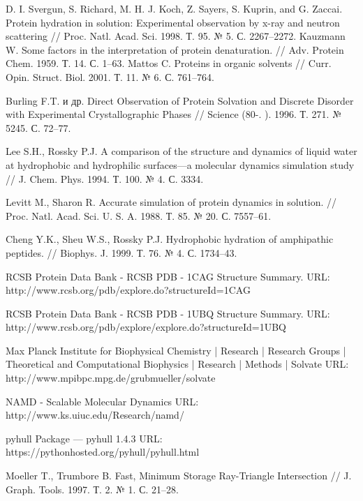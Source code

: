 \documentclass[a4paper]{article}
\begin{document}
\begin{thebibliography}{99}
 D. I. Svergun, S. Richard, M. H. J. Koch, Z. Sayers, S. Kuprin, and G. Zaccai. Protein hydration in solution: Experimental observation by x-ray and neutron scattering // Proc. Natl. Acad. Sci. 1998. Т. 95. № 5. С. 2267–2272.
 Kauzmann W. Some factors in the interpretation of protein denaturation. // Adv. Protein Chem. 1959. Т. 14. С. 1–63.
 Mattos C. Proteins in organic solvents // Curr. Opin. Struct. Biol. 2001. Т. 11. № 6. С. 761–764.


 Burling F.T. и др. Direct Observation of Protein Solvation and Discrete Disorder with Experimental Crystallographic Phases // Science (80-. ). 1996. Т. 271. № 5245. С. 72–77.

  Lee S.H., Rossky P.J. A comparison of the structure and dynamics of liquid water at hydrophobic and hydrophilic surfaces—a molecular dynamics simulation study // J. Chem. Phys. 1994. Т. 100. № 4. С. 3334.

  Levitt M., Sharon R. Accurate simulation of protein dynamics in solution. // Proc. Natl. Acad. Sci. U. S. A. 1988. Т. 85. № 20. С. 7557–61.

 Cheng Y.K., Sheu W.S., Rossky P.J. Hydrophobic hydration of amphipathic peptides. // Biophys. J. 1999. Т. 76. № 4. С. 1734–43.

 RCSB Protein Data Bank - RCSB PDB - 1CAG Structure Summary. URL: http://www.rcsb.org/pdb/explore.do?structureId=1CAG

 RCSB Protein Data Bank - RCSB PDB - 1UBQ Structure Summary. URL: http://www.rcsb.org/pdb/explore/explore.do?structureId=1UBQ

 Max Planck Institute for Biophysical Chemistry | Research | Research Groups | Theoretical and Computational Biophysics | Research | Methods | Solvate URL: http://www.mpibpc.mpg.de/grubmueller/solvate

 NAMD - Scalable Molecular Dynamics URL: http://www.ks.uiuc.edu/Research/namd/ 

 pyhull Package — pyhull 1.4.3 URL: https://pythonhosted.org/pyhull/pyhull.html

 Moeller T., Trumbore B. Fast, Minimum Storage Ray-Triangle Intersection // J. Graph. Tools. 1997. Т. 2. № 1. С. 21–28.

\end{thebibliography}
\end{document}
